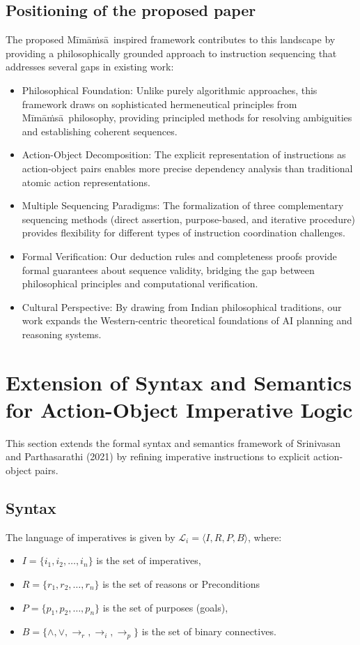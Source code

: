 \documentclass[a4paper,11pt]{lmcs}
\newcommand{\mimamsa}{M\={i}m\={a}\.ms\={a}}
\begin{document}
\subsection*{Positioning of the proposed paper}
The proposed \mimamsa~inspired framework contributes to this landscape by providing a philosophically grounded approach to instruction sequencing that addresses several gaps in existing work:
\begin{itemize}
 \item Philosophical Foundation: Unlike purely algorithmic approaches, this framework draws on sophisticated hermeneutical principles from \mimamsa~philosophy, providing principled methods for resolving ambiguities and establishing coherent sequences.
 \item Action-Object Decomposition: The explicit representation of instructions as action-object pairs enables more precise dependency analysis than traditional atomic action representations.
 \item Multiple Sequencing Paradigms: The formalization of three complementary sequencing methods (direct assertion, purpose-based, and iterative procedure) provides flexibility for different types of instruction coordination challenges.
 \item Formal Verification: Our deduction rules and completeness proofs provide formal guarantees about sequence validity, bridging the gap between philosophical principles and computational verification.
\item Cultural Perspective: By drawing from Indian philosophical traditions, our work expands the Western-centric theoretical foundations of AI planning and reasoning systems.
\end{itemize}










\section{Extension of Syntax and Semantics for Action-Object Imperative Logic}
This section extends the formal syntax and semantics framework of Srinivasan and Parthasarathi (2021) \cite{mira} by refining imperative instructions to explicit action-object pairs.
\subsection{Syntax}
\label{sec:syntax}
The language of imperatives is given by \(\mathcal{L}_i = \langle I, R, P, B \rangle\), where:
\begin{itemize}
  \item \(I = \{ i_1, i_2, \ldots, i_n \}\) is the set of imperatives,
  \item \(R = \{ r_1, r_2, \ldots, r_n \}\) is the set of reasons or Preconditions
  \item \(P = \{ p_1, p_2, \ldots, p_n \}\) is the set of purposes (goals),
  \item \(B = \{ \wedge, \vee, \rightarrow_r, \rightarrow_i, \rightarrow_p \}\) is the set of binary connectives.
\end{itemize}
\end{document}
